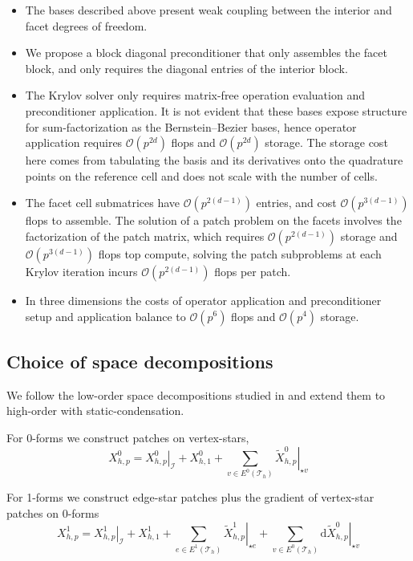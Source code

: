 \documentclass[review,onefignum,onetabnum,a4paper]{siamart190516}
\newcommand{\bigo}[1]{\mathcal{O}(#1)}
\newcommand{\mesh}{\mathcal{T}_h}
\begin{document}
\begin{itemize}
\item The bases described above present weak coupling between the interior and facet degrees of freedom.
\item We propose a block diagonal preconditioner that only assembles the facet block, and only requires the diagonal entries of the interior block.
\item The Krylov solver only requires matrix-free operation evaluation and preconditioner application. It is not evident that these bases expose structure for sum-factorization as the Bernstein--Bezier bases, hence operator application requires $\bigo{p^{2d}}$ flops and $\bigo{p^{2d}}$ storage. The storage cost here comes from tabulating the basis and its derivatives onto the quadrature points on the reference cell and does not scale with the number of cells.
\item The facet cell submatrices have $\bigo{p^{2(d-1)}}$ entries, and cost $\bigo{p^{3(d-1)}}$ flops to assemble. 
The solution of a patch problem on the facets involves the factorization of the patch matrix, which requires $\bigo{p^{2(d-1)}}$ storage and $\bigo{p^{3(d-1)}}$ flops top compute, solving the patch subproblems at each Krylov iteration incurs $\bigo{p^{2(d-1)}}$ flops per patch. 
\item In three dimensions the costs of operator application and preconditioner setup and application balance to $\bigo{p^6}$ flops and $\bigo{p^4}$ storage.
\end{itemize}

\subsection{Choice of space decompositions}
We follow 
the low-order space decompositions studied in \cite{arnold00}
and extend them to high-order with static-condensation.

For 0-forms we construct patches on vertex-stars,
\begin{equation}
   X^0_{h,p} = \left.X^0_{h,p}\right|_\mathcal{I} + X^0_{h,1} 
   + \sum_{v\in E^0(\mesh)} \left.\tilde{X}^0_{h,p}\right|_{\star v} 
\end{equation}

For 1-forms we construct edge-star patches
plus the gradient of vertex-star patches on 0-forms
\begin{equation}
   X^1_{h,p} = \left.X^1_{h,p}\right|_\mathcal{I} +  X^1_{h,1}
   + \sum_{e\in E^1(\mesh)} \left.\tilde{X}^1_{h,p}\right|_{\star e} 
   + \sum_{v\in E^0(\mesh)} \mathrm{d} \left.\tilde{X}^0_{h,p}\right|_{\star v} 
\end{equation}
\end{document}
